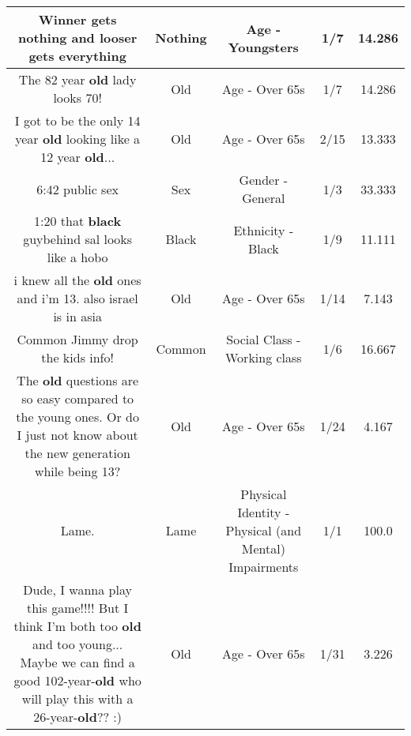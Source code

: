 \documentclass[11pt]{article}
\newlength\mylength
\begin{document}
\begin{center}
\begin{longtable}{|C{.65\mylength}|C{.30\mylength}|C{.12\mylength}|C{.12\mylength}|C{.12\mylength}|}
  \small Winner gets \textbf{nothing} and looser gets everything\normalsize   & Nothing & Age - Youngsters & 1/7 & 14.286 \\  \hline
  \small The 82 year \textbf{old} lady looks 70!\normalsize   & Old & Age - Over 65s & 1/7 & 14.286 \\  \hline
  \small I got to be the only 14 year \textbf{old} looking like a 12 year \textbf{old}...\normalsize   & Old & Age - Over 65s & 2/15 & 13.333 \\  \hline
  \small 6:42 public sex\normalsize   & Sex & Gender - General & 1/3 & 33.333 \\  \hline
  \small 1:20 that \textbf{black} guybehind sal looks like a hobo\normalsize   & Black & Ethnicity - Black & 1/9 & 11.111 \\  \hline
  \small i knew all the \textbf{old} ones and i'm 13. also israel is in asia\normalsize   & Old & Age - Over 65s & 1/14 & 7.143 \\  \hline
  \small Common Jimmy drop the kids info!\normalsize   & Common & Social Class - Working class & 1/6 & 16.667 \\  \hline
  \small The \textbf{old} questions are so easy compared to the young ones.  Or do I just not know about the new generation while being 13?\normalsize   & Old & Age - Over 65s & 1/24 & 4.167 \\  \hline
  \small Lame.\normalsize   & Lame & Physical Identity - Physical (and Mental) Impairments & 1/1 & 100.0 \\  \hline
  \small Dude, I wanna play this game!!!!  But I think I'm both too \textbf{old} and too young... Maybe we can find a good 102-year-\textbf{old} who will play this with a 26-year-\textbf{old}??  :)\normalsize   & Old & Age - Over 65s & 1/31 & 3.226 \\  \hline

\end{longtable}
\end{center}
\end{document}
